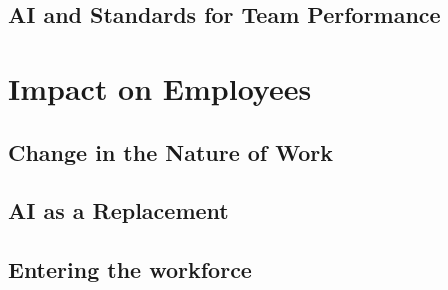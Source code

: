 \documentclass[
]{book}
\begin{document}
\hypertarget{ai-and-standards-for-team-performance}{%
\section{AI and Standards for Team Performance}\label{ai-and-standards-for-team-performance}}

\hypertarget{impact-on-employees}{%
\chapter{Impact on Employees}\label{impact-on-employees}}

\hypertarget{change-in-the-nature-of-work}{%
\section{Change in the Nature of Work}\label{change-in-the-nature-of-work}}

\hypertarget{ai-as-a-replacement}{%
\section{AI as a Replacement}\label{ai-as-a-replacement}}

\hypertarget{entering-the-workforce}{%
\section{Entering the workforce}\label{entering-the-workforce}}

  
\end{document}

